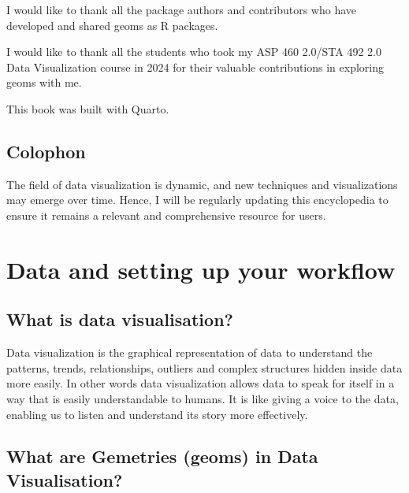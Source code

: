 \documentclass[
  letterpaper,
  DIV=11,
  numbers=noendperiod]{scrreprt}
\begin{document}

I would like to thank all the package authors and contributors who have
developed and shared geoms as R packages.

I would like to thank all the students who took my ASP 460 2.0/STA 492
2.0 Data Visualization course in 2024 for their valuable contributions
in exploring geoms with me.

This book was built with Quarto.

\section*{Colophon}\label{colophon}


The field of data visualization is dynamic, and new techniques and
visualizations may emerge over time. Hence, I will be regularly updating
this encyclopedia to ensure it remains a relevant and comprehensive
resource for users.


\chapter*{Data and setting up your
workflow}\label{data-and-setting-up-your-workflow}


\section*{What is data visualisation?}\label{what-is-data-visualisation}


Data visualization is the graphical representation of data to understand
the patterns, trends, relationships, outliers and complex structures
hidden inside data more easily. In other words data visualization allows
data to speak for itself in a way that is easily understandable to
humans. It is like giving a voice to the data, enabling us to listen and
understand its story more effectively.

\section*{What are Gemetries (geoms) in Data
Visualisation?}\label{what-are-gemetries-geoms-in-data-visualisation}
\end{document}
